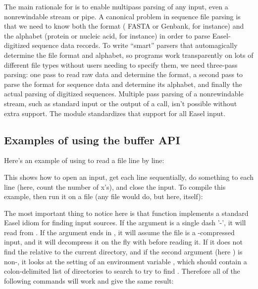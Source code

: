 The main rationale for  is to enable multipass parsing
of any input, even a nonrewindable stream or pipe. A canonical problem
in sequence file parsing is that we need to know both the format (
FASTA or Genbank, for instance) and the alphabet (protein or nucleic
acid, for instance) in order to parse Easel-digitized sequence data
records. To write ``smart'' parsers that automagically determine the
file format and alphabet, so programs work transparently on lots of
different file types without users needing to specify them, we need
three-pass parsing: one pass to read raw data and determine the
format, a second pass to parse the format for sequence data and
determine its alphabet, and finally the actual parsing of digitized
sequences. Multiple pass parsing of a nonrewindable stream, such as
standard input or the output of a  call, isn't possible
without extra support. The  module standardizes that
support for all Easel input.

\subsection{Examples of using the buffer API}

Here's an example of using  to read a file line by
line:



This shows how to open an input, get each line sequentially, do
something to each line (here, count the number of x's), and close the
input.  To compile this example, then run it on a file (any file would
do, but here,  itself):


The most important thing to notice here is that
 function implements a standard Easel idiom
for finding input sources. If the  argument is a
single dash '-', it will read from . If the
 argument ends in , it will assume the file
is a -compressed input, and it will decompress it on the
fly with  before reading it. If it does not find the
 relative to the current directory, and if the second
argument (here ) is non-, it looks at the
setting of an environment variable , which should
contain a colon-delimited list of directories to search to try to find
. Therefore all of the following commands will work
and give the same result:

